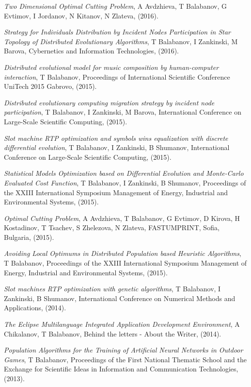 \documentclass[english,a4paper]{europasscv}
\begin{document}
\begin{europasscv}
{\begin{ecvitemize}
    \item \textit{Two Dimensional Optimal Cutting Problem}, A Avdzhieva, T Balabanov, G Evtimov, I Jordanov, N Kitanov, N Zlateva, (2016).
    \item \textit{Strategy for Individuals Distribution by Incident Nodes Participation in Star Topology of Distributed Evolutionary Algorithms}, T Balabanov, I Zankinski, M Barova, Cybernetics and Information Technologies, (2016).
    \item \textit{Distributed evolutional model for music composition by human-computer interaction}, T Balabanov, Proceedings of International Scientific Conference UniTech 2015 Gabrovo, (2015).
    \item \textit{Distributed evolutionary computing migration strategy by incident node participation}, T Balabanov, I Zankinski, M Barova, International Conference on Large-Scale Scientific Computing, (2015).
    \item \textit{Slot machine RTP optimization and symbols wins equalization with discrete differential evolution}, T Balabanov, I Zankinski, B Shumanov, International Conference on Large-Scale Scientific Computing, (2015).
    \item \textit{Statistical Models Optimization based on Differential Evolution and Monte-Carlo Evaluated Cost Function}, T Balabanov, I Zankinski, B Shumanov, Proceedings of the XXIII International Symposium Management of Energy, Industrial and Environmental Systems, (2015).
    \item \textit{Optimal Cutting Problem}, A Avdzhieva, T Balabanov, G Evtimov, D Kirova, H Kostadinov, T Tsachev, S Zhelezova, N Zlateva, FASTUMPRINT, Sofia, Bulgaria, (2015).
    \item \textit{Avoiding Local Optimums in Distributed Population based Heuristic Algorithms}, T Balabanov, Proceedings of the XXIII International Symposium Management of Energy, Industrial and Environmental Systems, (2015).
    \item \textit{Slot machines RTP optimization with genetic algorithms}, T Balabanov, I Zankinski, B Shumanov, International Conference on Numerical Methods and Applications, (2014).
    \item \textit{The Eclipse Multilanguage Integrated Application Development Environment}, A Chikalanov, T Balabanov, Behind the letters - About the Writer, (2014).
    \item \textit {Population Algorithms for the Training of Artificial Neural Networks in Outdoor Games}, T Balabanov, Proceedings of the First National Thematic School and the Exchange for Scientific Ideas in Information and Communication Technologies, (2013).

\end{ecvitemize}}
\end{europasscv}
\end{document}
